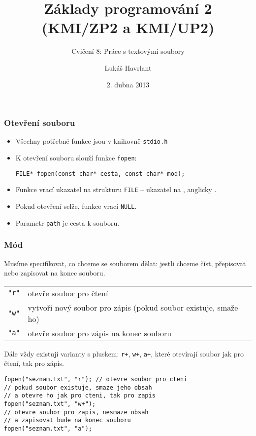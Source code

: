 \documentclass{beamer}
\title{Základy programování 2 (KMI/ZP2 a KMI/UP2)}
\subtitle{Cvičení 8: Práce s textovými soubory}
\author{Lukáš Havrlant}
\date{2. dubna 2013}
\institute{Univerzita Palackého}
\newenvironment{itemizex}%
  {\large \begin{itemize}%
    \setlength{\itemsep}{8pt}%
    \setlength{\parskip}{8pt}}%
  {\end{itemize}}
\begin{document}
\begin{frame}[t,plain]
\titlepage
\end{frame}


\begin{frame}[t,fragile]\frametitle{Otevření souboru} 
    \begin{itemizex}
        \item Všechny potřebné funkce jsou v knihovně \texttt{stdio.h}
        \item K otevření souboru slouží funkce \texttt{fopen}:
\begin{verbatim} 
FILE* fopen(const char* cesta, const char* mod);
\end{verbatim}
        \item Funkce vrací ukazatel na strukturu \texttt{FILE} -- ukazatel na , anglicky .
        \item Pokud otevření selže, funkce vrací \texttt{NULL}.
        \item Parametr \texttt{path} je cesta k souboru.
    \end{itemizex}
\end{frame}


\begin{frame}[t,fragile]\frametitle{Mód} 
Musíme specifikovat, co chceme se souborem dělat: jestli chceme číst, přepisovat nebo zapisovat na konec souboru. 

\begin{tabular}{cl}
\texttt{"r"} & otevře soubor pro čtení\\
\texttt{"w"} & vytvoří nový soubor pro zápis (pokud soubor existuje, smaže ho)\\
\texttt{"a"} & otevře soubor pro zápis na konec souboru\\
\end{tabular}

Dále vždy existují varianty s pluskem: \texttt{r+}, \texttt{w+}, \texttt{a+}, které otevírají soubor jak pro čtení, tak pro zápis. 

\begin{verbatim} 
fopen("seznam.txt", "r"); // otevre soubor pro cteni
// pokud soubor existuje, smaze jeho obsah
// a otevre ho jak pro cteni, tak pro zapis
fopen("seznam.txt", "w+"); 
// otevre soubor pro zapis, nesmaze obsah
// a zapisovat bude na konec souboru
fopen("seznam.txt", "a"); 
\end{verbatim}
\end{frame}
\end{document}

